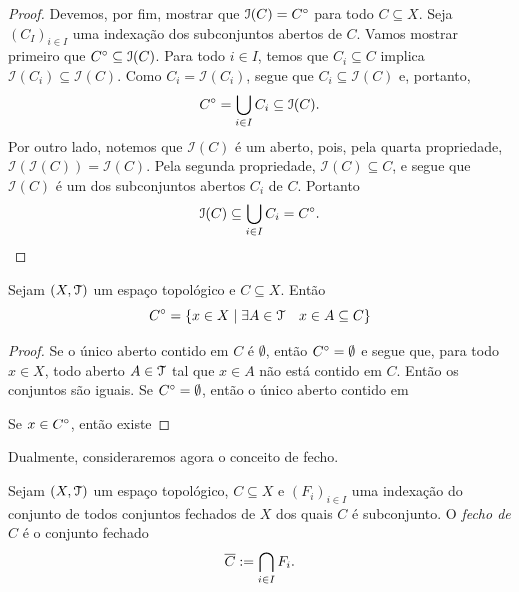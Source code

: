 \begin{proof}
Devemos, por fim, mostrar que $\mathcal I(C)={C}^\circ$ para todo $C \subseteq X$. Seja $(C_I)_{i \in I}$ uma indexação dos subconjuntos abertos de $C$. Vamos mostrar primeiro que ${C}^\circ \subseteq \mathcal I(C)$. Para todo $i \in I$, temos que $C_i \subseteq C$ implica $\mathcal I(C_i) \subseteq \mathcal I(C)$. Como $C_i = \mathcal I(C_i)$, segue que $C_i \subseteq \mathcal I(C)$ e, portanto,
	\begin{equation*}
	{C}^\circ = \bigcup_{i \in I} C_i \subseteq \mathcal I(C).
	\end{equation*}
	Por outro lado, notemos que $\mathcal I(C)$ é um aberto, pois, pela quarta propriedade, $\mathcal I(\mathcal I(C))= \mathcal I(C)$. Pela segunda propriedade, $\mathcal I(C) \subseteq C$, e segue que $\mathcal I(C)$ é um dos subconjuntos abertos $C_i$ de $C$. Portanto	
	\begin{equation*}
	\mathcal I(C) \subseteq \bigcup_{i \in I} C_i = {C}^\circ.
	\end{equation*}
\end{proof}

\begin{proposition}
	Sejam $(X, \mathcal{T})$ um espaço topológico e $C \subseteq X$. Então
	\begin{equation*}
	{C}^\circ = \left\{{x \in X}\;\middle\vert\;{\exists A \in \mathcal{T} \quad x \in A \subseteq C}\right\}
	\end{equation*}
\end{proposition}
\begin{proof}
	Se o único aberto contido em $C$ é $\emptyset$, então ${C}^\circ=\emptyset$ e segue que, para todo $x \in X$, todo aberto $A \in \mathcal{T}$ tal que $x \in A$ não está contido em $C$. Então os conjuntos são iguais.
	Se ${C}^\circ=\emptyset$, então o único aberto contido em 
	
	
	Se $x \in {C}^\circ$, então existe
\end{proof}

	Dualmente, consideraremos agora o conceito de fecho.

\begin{definition}
	Sejam $(X,\mathcal{T})$ um espaço topológico, $C \subseteq X$ e $(F_i)_{i \in I}$ uma indexação do conjunto de todos conjuntos fechados de $X$ dos quais $C$ é subconjunto. O \emph{fecho de $C$} é o conjunto fechado
	\begin{equation*}
	\overline{C} := \bigcap_{i \in I} F_i.
	\end{equation*}
\end{definition}

